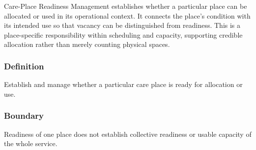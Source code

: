 Care-Place Readiness Management establishes whether a particular place can be allocated or used in its operational context. It connects the place's condition with its intended use so that vacancy can be distinguished from readiness. This is a place-specific responsibility within scheduling and capacity, supporting credible allocation rather than merely counting physical spaces.

\subsubsection*{Definition}

Establish and manage whether a particular care place is ready for allocation or use.

\subsubsection*{Boundary}

Readiness of one place does not establish collective readiness or usable capacity of the whole service.

